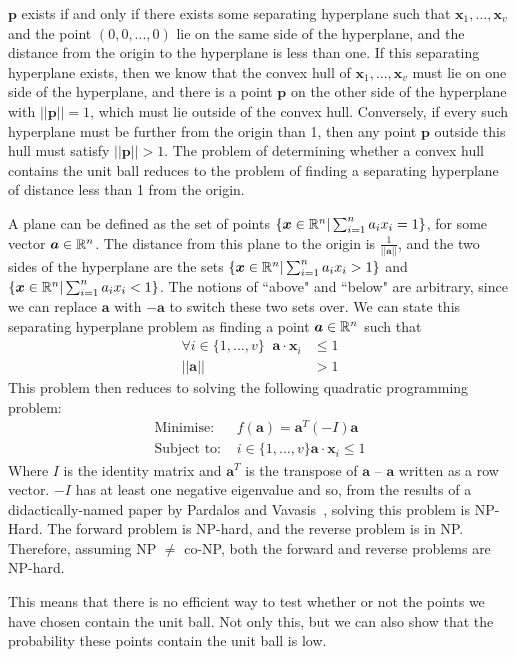 $\bm p$ exists if and only if there exists some separating hyperplane such that ${\bm x}_1, ..., {\bm x}_v$ and the point $(0,0,...,0)$ lie on the same side of the hyperplane, and the distance from the origin to the hyperplane is less than one. If this separating hyperplane exists, then we know that the convex hull of ${\bm x}_1, ..., {\bm x}_v$ must lie on  one side of the hyperplane, and there is a point $\bm p$ on the other side of the hyperplane with $||\bm{p}|| = 1$, which must lie outside of the convex hull. Conversely, if every such hyperplane must be further from the origin than 1, then any point $\bm p$ outside this hull must satisfy $||\bm{p}||>1$. The problem of determining whether a convex hull contains the unit ball reduces to the problem of finding a separating hyperplane of distance less than 1 from the origin.

A plane can be defined as the set of points $\{ {\bm x} \in \mathbb{R} ^n | \sum^n_{i=1} a_i x_i = 1\}$, for some vector ${\bm a} \in \mathbb{R} ^n$. The distance from this plane to the origin is $\frac{1}{||{\bm a}||}$, and the two sides of the hyperplane are the sets $\{ {\bm x} \in \mathbb{R} ^n | \sum^n_{i=1} a_i x_i > 1 \}$ and $\{ {\bm x} \in \mathbb{R} ^n | \sum^n_{i=1} a_i x_i < 1 \}$. The notions of ``above" and ``below" are arbitrary, since we can replace $\bm a$ with $-\bm{a}$ to switch these two sets over. We can state this separating hyperplane problem as finding a point ${\bm a} \in \mathbb{R}^n$ such that
\begin{align*}
\forall i \in \{1, ..., v\} \; \; {\bm a} \cdot {\bm x}_i &\leqslant 1 \\
||{\bm a}|| &> 1
\end{align*}
This problem then reduces to solving the following quadratic programming problem:
\begin{align*}
\mbox{Minimise: }& f({\bm a}) = {\bm a}^T (-I) {\bm a} \\
\mbox{Subject to: }& i \in \{1, ..., v\} {\bm a} \cdot {\bm x}_i \leqslant 1 
\end{align*}
Where $I$ is the identity matrix and ${\bm a}^T$ is the transpose of ${\bm a}$ -- ${\bm a}$ written as a row vector. $-I$ has at least one negative eigenvalue and so, from the results of a didactically-named paper by Pardalos and Vavasis~\cite{Pardalos91}, solving this problem is NP-Hard. The forward problem is NP-hard, and the reverse problem is in NP. Therefore, assuming NP $\neq$ co-NP, both the forward and reverse problems are NP-hard.

This means that there is no efficient way to test whether or not the points we have chosen contain the unit ball. Not only this, but we can also show that the probability these points contain the unit ball is low.

